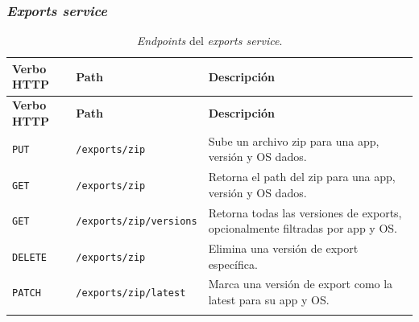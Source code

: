 \subsubsection{\textit{Exports service}}
 
\renewcommand{\arraystretch}{1.4}
\begin{longtable}{|p{2cm}|p{7cm}|p{5.5cm}|}
\hline
\textbf{Verbo HTTP} & \textbf{Path} & \textbf{Descripción} \\
\hline
\endfirsthead
 
\hline
\textbf{Verbo HTTP} & \textbf{Path} & \textbf{Descripción} \\
\hline
\endhead
 
\endfoot

\texttt{PUT}    & \texttt{/exports/zip}          & Sube un archivo zip para una app, versión y OS dados. \\
\hline
\texttt{GET}    & \texttt{/exports/zip}          & Retorna el path del zip para una app, versión y OS dados. \\
\hline
\texttt{GET}    & \texttt{/exports/zip/versions} & Retorna todas las versiones de exports, opcionalmente filtradas por app y OS. \\
\hline
\texttt{DELETE} & \texttt{/exports/zip}          & Elimina una versión de export específica. \\
\hline
\texttt{PATCH}  & \texttt{/exports/zip/latest}   & Marca una versión de export como la latest para su app y OS. \\
\hline
\caption{\textit{Endpoints} del \textit{exports service}.}\label{tab:exports-endpoints}
\end{longtable}
